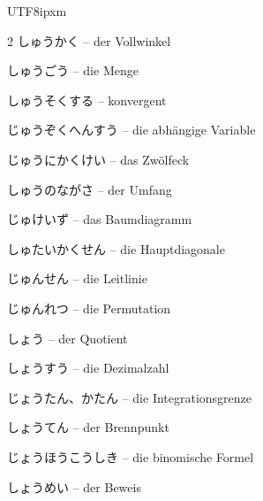\begin{CJK}{UTF8}{ipxm}
\begin{multicols}{2}
 {\footnotesize\color{black!70}しゅうかく} -- der Vollwinkel\dotfill\hyperref[e:162]{\pageref*{e:162}}\par
{} {\footnotesize\color{black!70}しゅうごう} -- die Menge\dotfill\hyperref[e:96]{\pageref*{e:96}}\par
{} {\footnotesize\color{black!70}しゅうそくする} -- konvergent\dotfill\hyperref[e:262]{\pageref*{e:262}}\par
{} {\footnotesize\color{black!70}じゅうぞくへんすう} -- die abhängige Variable\dotfill\hyperref[e:107]{\pageref*{e:107}}\par
{} {\footnotesize\color{black!70}じゅうにかくけい} -- das Zwölfeck\dotfill\hyperref[e:208]{\pageref*{e:208}}\par
{} {\footnotesize\color{black!70}しゅうのながさ} -- der Umfang\dotfill\hyperref[e:209]{\pageref*{e:209}}\par
{} {\footnotesize\color{black!70}じゅけいず} -- das Baumdiagramm\dotfill\hyperref[e:332]{\pageref*{e:332}}\par
{} {\footnotesize\color{black!70}しゅたいかくせん} -- die Hauptdiagonale\dotfill\hyperref[e:324]{\pageref*{e:324}}\par
{} {\footnotesize\color{black!70}じゅんせん} -- die Leitlinie\dotfill\hyperref[e:318]{\pageref*{e:318}}\par
{} {\footnotesize\color{black!70}じゅんれつ} -- die Permutation\dotfill\hyperref[e:341]{\pageref*{e:341}}\par
{} {\footnotesize\color{black!70}しょう} -- der Quotient\dotfill\hyperref[e:25]{\pageref*{e:25}}\par
{} {\footnotesize\color{black!70}しょうすう} -- die Dezimalzahl\dotfill\hyperref[e:13]{\pageref*{e:13}}\par
{} {\footnotesize\color{black!70}じょうたん、かたん} -- die Integrationsgrenze\dotfill\hyperref[e:297]{\pageref*{e:297}}\par
{} {\footnotesize\color{black!70}しょうてん} -- der Brennpunkt\dotfill\hyperref[e:316]{\pageref*{e:316}}\par
{} {\footnotesize\color{black!70}じょうほうこうしき} -- die binomische Formel\dotfill\hyperref[e:93]{\pageref*{e:93}}\par
{} {\footnotesize\color{black!70}しょうめい} -- der Beweis\dotfill\hyperref[e:349]{\pageref*{e:349}}\par

\end{multicols}
\end{CJK}
